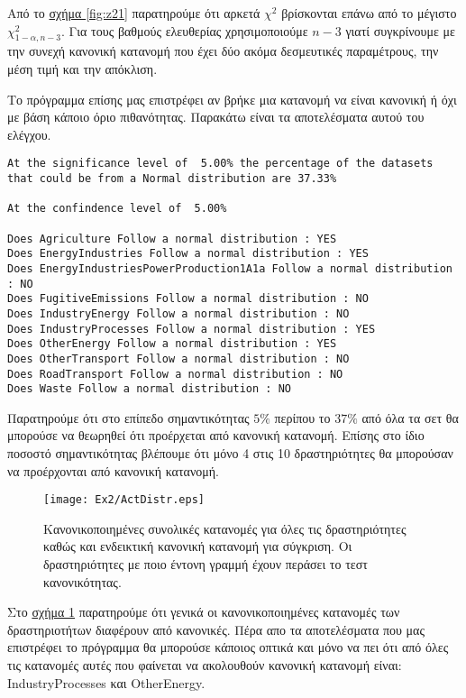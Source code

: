 \documentclass[11pt]{scrartcl} %
\begin{document}
Από το \hyperref[fig:z21]{σχήμα \ref*{fig:z21}} παρατηρούμε ότι αρκετά 
$\chi^{2}$ βρίσκονται επάνω από το μέγιστο $\chi^{2}_{1-\alpha,n-3}$. Για τους βαθμούς ελευθερίας χρησιμοποιούμε $n-3$ γιατί συγκρίνουμε με την συνεχή κανονική κατανομή που έχει δύο ακόμα δεσμευτικές παραμέτρους, την μέση τιμή και την απόκλιση.


Το πρόγραμμα επίσης μας επιστρέφει αν βρήκε μια κατανομή να είναι κανονική ή όχι με βάση κάποιο όριο πιθανότητας. Παρακάτω είναι τα αποτελέσματα αυτού του ελέγχου.

\begin{verbatim}
At the significance level of  5.00% the percentage of the datasets
that could be from a Normal distribution are 37.33% 

At the confindence level of  5.00%

Does Agriculture Follow a normal distribution : YES
Does EnergyIndustries Follow a normal distribution : YES
Does EnergyIndustriesPowerProduction1A1a Follow a normal distribution : NO
Does FugitiveEmissions Follow a normal distribution : NO
Does IndustryEnergy Follow a normal distribution : NO
Does IndustryProcesses Follow a normal distribution : YES
Does OtherEnergy Follow a normal distribution : YES
Does OtherTransport Follow a normal distribution : NO
Does RoadTransport Follow a normal distribution : NO
Does Waste Follow a normal distribution : NO
\end{verbatim}

Παρατηρούμε ότι στο επίπεδο σημαντικότητας $5\%$ περίπου το $37\%$ από όλα τα σετ θα μπορούσε να θεωρηθεί ότι προέρχεται από κανονική κατανομή. Επίσης στο ίδιο ποσοστό σημαντικότητας βλέπουμε ότι μόνο 4 στις 10 δραστηριότητες θα μπορούσαν να προέρχονται από κανονική κατανομή.

\begin{figure}[H]
\label{fig:z22} 
	\centering
	\texttt{[image: Ex2/ActDistr.eps]}	
\caption{Κανονικοποιημένες συνολικές κατανομές για όλες τις δραστηριότητες καθώς και ενδεικτική κανονική κατανομή για σύγκριση. Οι δραστηριότητες με ποιο έντονη γραμμή έχουν περάσει το τεστ κανονικότητας.}
\end{figure}

Στο \hyperref[fig:z22]{σχήμα \ref*{fig:z22}} παρατηρούμε ότι γενικά οι κανονικοποιημένες κατανομές των δραστηριοτήτων διαφέρουν από κανονικές. Πέρα απο τα αποτελέσματα που μας επιστρέφει το πρόγραμμα θα μπορούσε κάποιος οπτικά και μόνο να πει ότι από όλες τις κατανομές αυτές που φαίνεται να ακολουθούν κανονική κατανομή είναι: IndustryProcesses και OtherEnergy.   
\end{document}
